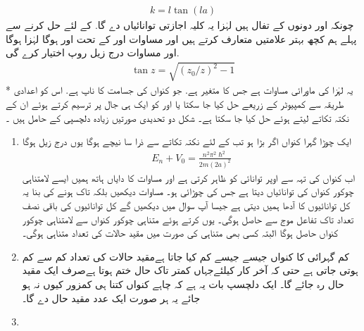 \begin{align}k=l\tan(la)  \end{align}
 چونکہ   اور  دونوں  کے تفال ہیں لہٰزا یہ کلیہ اجازتی توانائیاں دے گا.   کے لئے حل کرنے سے پہلے ہم کچھ بہتر علامتیں متعارف کرتے ہیں اور 
مساوات  اور کے تحت  اور ہوگا لہٰزا  ہوگا اور مساوات 
 درج زیل روپ اختیار کرے گی.
\begin{align}\tan z=\sqrt{(z_{0}/z)^{2}-1} \end{align}
* یہ  لہٰزا  کی ماورائی مساوات ہے جس کا متغیر  ہے. جو کنواں کی جسامت کا ناپ ہے. اس کو اعدادی طریقہ سے کمپیوٹر کے زریعے حل کیا جا سکتا یا  اور  کو ایک ہی جال پر ترسیم کرتے ہوئے ان کے نکتہ تکاتے لیتے ہوئے  حل کیا جا سکتا ہے۔
 شکل    دو تحدیدی صورتیں زیادہ دلچسپی کے حامل ہیں ۔ 
\begin{enumerate}
\item ایک چوڑا گہرا کنواں
 اگر  بڑا ہو تب کے لئے نکتہ تکاتے سے ذرا سا نیچے ہوگا یوں درج زیل ہوگا
\begin{align}E_{n}+V_{0}=\frac{n^{2}\pi^{2}\hslash^{2}}{2m(2a)^{2}} \end{align}
اب کنواں کی تہہ سے اوپر توانائی کو ظاہر کرتی ہے اور مساوات کا دایاں ہاتھ ہمیں ایسے لامتناہی چوکور کنواں کی توانائیاں دیتا ہے جس کی چوڑائی  ہو۔
 مساوات دیکھیں بلکہ  تاک ہونے کی بنا یہ کل توانائیوں کا آدھا ہمیں دیتی ہے جیسا آپ سوال  میں دیکھیں گے کل توانائیوں کی باقی نصف تعداد تاک تفاعل موج سے حاصل ہوگی۔ 
 یوں کرتے ہوئے متناہی چوکور کنواں سے لامتناہی چوکور کنواں حاصل ہوگا البتہ کسی بھی متناہی  کی صورت میں مقید حالات کی تعداد متناہی ہوگی۔ 
\item  کم گہرائی کا کنواں 
 جیسے جیسے کم کیا جاتا ہےمقید حالات کی تعداد کم سے کم ہوتی جاتی ہے  حتی کہ آخر کار  کیلئےجہاں کمتر تاک حال ختم ہوتا ہےصرف ایک  مقید حال رہ جائے گا۔   ایک دلچسپ بات یہ ہے کہ چاہے کنواں کتنا ہی کمزور کیوں نہ ہو جائے یہ ہر صورت ایک عدد مقید حال دے گا۔ 

\item
\end{enumerate}





